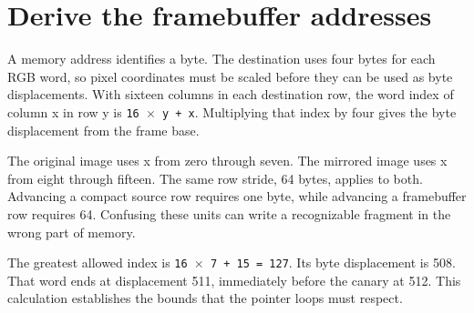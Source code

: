 \section{Derive the framebuffer
  addresses}\label{003-eight-byte-sprite-p02-derive-the-framebuffer-addresses}

A memory address identifies a byte. The destination uses four bytes for
each RGB word, so pixel coordinates must be scaled before they can be
used as byte displacements. With sixteen columns in each destination
row, the word index of column x in row y is \texttt{16\ \ensuremath{\times}\ y\ +\ x}.
Multiplying that index by four gives the byte displacement from the
frame base.

The original image uses x from zero through seven. The mirrored image
uses x from eight through fifteen. The same row stride, 64 bytes,
applies to both. Advancing a compact source row requires one byte, while
advancing a framebuffer row requires 64. Confusing these units can write
a recognizable fragment in the wrong part of memory.

The greatest allowed index is \texttt{16\ \ensuremath{\times}\ 7\ +\ 15\ =\ 127}. Its byte
displacement is 508. That word ends at displacement 511, immediately
before the canary at 512. This calculation establishes the bounds that
the pointer loops must respect.
